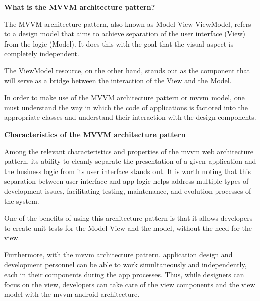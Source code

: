\documentclass{article}
\begin{document}
\textbf{What is the MVVM architecture pattern?}

The MVVM architecture pattern, also known as Model View ViewModel, refers to a design model that aims to achieve separation of the user interface (View) from the logic (Model). It does this with the goal that the visual aspect is completely independent.

The ViewModel resource, on the other hand, stands out as the component that will serve as a bridge between the interaction of the View and the Model.

In order to make use of the MVVM architecture pattern or mvvm model, one must understand the way in which the code of applications is factored into the appropriate classes and understand their interaction with the design components.

\textbf{Characteristics of the MVVM architecture pattern}

Among the relevant characteristics and properties of the mvvm web architecture pattern, its ability to cleanly separate the presentation of a given application and the business logic from its user interface stands out. It is worth noting that this separation between user interface and app logic helps address multiple types of development issues, facilitating testing, maintenance, and evolution processes of the system.

One of the benefits of using this architecture pattern is that it allows developers to create unit tests for the Model View and the model, without the need for the view.

Furthermore, with the mvvm architecture pattern, application design and development personnel can be able to work simultaneously and independently, each in their components during the app processes. Thus, while designers can focus on the view, developers can take care of the view components and the view model with the mvvm android architecture.
\end{document}
